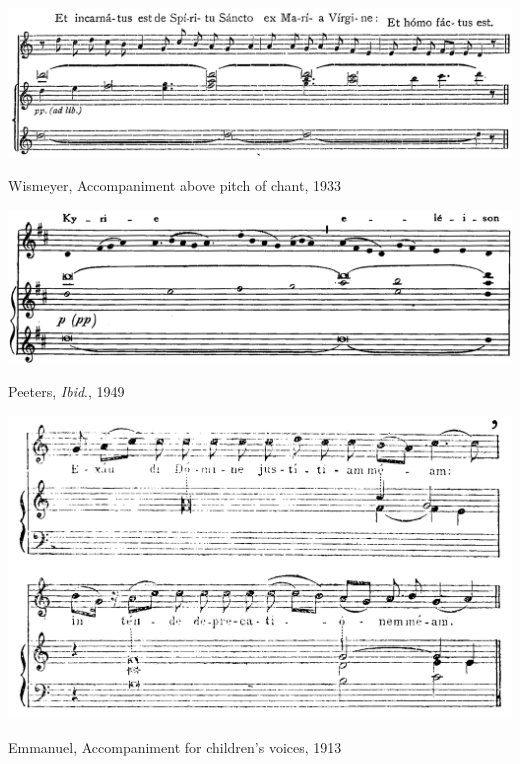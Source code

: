 \vspace*{\fill}

\newpage

  \vspace*{\fill}

  \begin{example}
    \centering
    \includegraphics[width=\linewidth]{c/4/ex/wismeyer_sustained.png}
    \caption{Wismeyer, Accompaniment above pitch of chant, 1933}

    \label{mus:wismeyer_sustained}
  \end{example}

  \vspace*{\fill}

  \begin{example}
    \centering
    \includegraphics[width=\linewidth]{c/4/ex/peeters_angelis_73.png}
    \caption{Peeters, \emph{Ibid}., 1949}
    \label{mus:peeters_angelis_73}
  \end{example}

  \vspace*{\fill}

\newpage

\vspace*{\fill}

\begin{example}
  \centering
  \includegraphics[width=\linewidth]{c/4/ex/emmanuel_traite_102.jpg}
  \caption{Emmanuel, Accompaniment for children's voices, 1913}
  \label{mus:emmanuel_traite_102}
\end{example}

